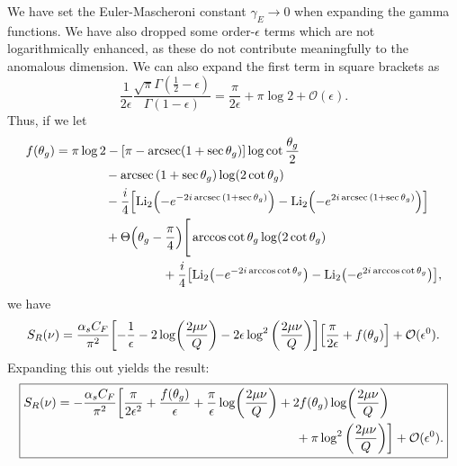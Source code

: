 \documentclass[../thesis.tex]{subfiles}
\providecommand{\Li}{\mathrm{Li}}
\providecommand{\cO}{\mathcal{O}}
\begin{document}
	We have set the Euler-Mascheroni constant $\gamma_E \to 0$ when expanding the gamma functions. We have also dropped some order-$\epsilon$ terms which are not logarithmically enhanced, as these do not contribute meaningfully to the anomalous dimension. We can also expand the first term in square brackets as
	\begin{equation}
		\frac{1}{2\epsilon}\frac{\sqrt{\pi} \Gamma(\frac{1}{2} - \epsilon)}{\Gamma(1 - \epsilon)} = \frac{\pi}{2\epsilon} + \pi \log 2 + \cO(\epsilon).
	\end{equation}
	Thus, if we let
	\begin{equation}\label{all-eq:f definition}
	\begin{aligned}
		f(\theta_g) &= \pi \log 2 - \qty[\pi - \arcsec(1 + \sec\theta_g)]\log\cot\frac{\theta_g}{2} \\
			&\qquad\qquad - \arcsec\qty(1 + \sec\theta_g) \log(2\cot\theta_g) \\
			&\qquad\qquad - \frac{i}{4}\qty[\Li_2\qty(-e^{-2i\arcsec\qty(1 + \sec\theta_g)}) - \Li_2\qty(-e^{2i\arcsec\qty(1 + \sec\theta_g)})] \\
			&\qquad\qquad+ \Theta\qty(\theta_g - \frac{\pi}{4})\Bigg[ \arccos\cot\theta_g \log(2\cot\theta_g) \\
			&\hspace{3cm}+ \frac{i}{4}\qty[\Li_2\qty(-e^{-2i\arccos\cot\theta_g}) - \Li_2\qty(-e^{2i\arccos\cot\theta_g})],
	\end{aligned}
	\end{equation}
	we have
	\begin{equation}
		S_R(\nu) = \frac{\alpha_s C_F}{\pi^2}\qty[-\frac{1}{\epsilon} - 2\log(\frac{2\mu \nu}{Q}) - 2\epsilon\log^2\qty(\frac{2\mu \nu}{Q})]\qty[\frac{\pi}{2\epsilon} + f(\theta_g)] + \cO(\epsilon^0).
	\end{equation}
	Expanding this out yields the result:
	\begin{equation}\label{all-eq:soft function laplace expanded}
	\boxed{
	\begin{aligned}
		S_R(\nu) = -\frac{\alpha_s C_F}{\pi^2} \bigg[\frac{\pi}{2\epsilon^2} + \frac{f(\theta_g)}{\epsilon} + \frac{\pi}{\epsilon}\log(\frac{2\mu \nu}{Q}) &+ 2f(\theta_g)\log(\frac{2\mu\nu}{Q}) \\
			&\hspace{0.5cm}+ \pi\log^2\qty(\frac{2\mu \nu}{Q}) \bigg] + \cO(\epsilon^0).
	\end{aligned}
	}
	\end{equation}
\end{document}
